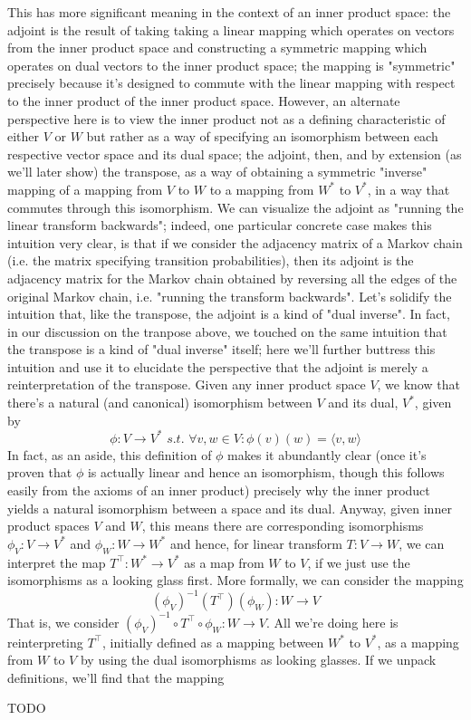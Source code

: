 \documentclass{article}
\newcommand{\nn}{\leavevmode \newline \newline}
\newcommand{\sti}{\textit{ s.t. }}
\begin{document}
This has more significant meaning in the context of an inner product space: the adjoint is the result of taking taking a linear mapping which operates on vectors from the inner product space and constructing a symmetric mapping which operates on dual vectors to the inner product space; the mapping is "symmetric" precisely because it's designed to commute with the linear mapping with respect to the inner product of the inner product space. However, an alternate perspective here is to view the inner product not as a defining characteristic of either $ V $ or $ W $ but rather as a way of specifying an isomorphism between each respective vector space and its dual space; the adjoint, then, and by extension (as we'll later show) the transpose, as a way of obtaining a symmetric "inverse" mapping of a mapping from $ V $ to $ W $ to a mapping from $ W^* $ to $ V^* $, in a way that commutes through this isomorphism. We can visualize the adjoint as "running the linear transform backwards"; indeed, one particular concrete case makes this intuition very clear, is that if we consider the adjacency matrix of a Markov chain (i.e. the matrix specifying transition probabilities), then its adjoint is the adjacency matrix for the Markov chain obtained by reversing all the edges of the original Markov chain, i.e. "running the transform backwards".
\nn
Let's solidify the intuition that, like the transpose, the adjoint is a kind of "dual inverse". In fact, in our discussion on the tranpose above, we touched on the same intuition that the transpose is a kind of "dual inverse" itself; here we'll further buttress this intuition and use it to elucidate the perspective that the adjoint is merely a reinterpretation of the transpose. Given any inner product space $ V $, we know that there's a natural (and canonical) isomorphism between $ V $ and its dual, $ V^* $, given by
    $$ \phi: V \rightarrow V^* \sti \forall v, w \in V: \phi(v)(w) = \langle v, w \rangle $$
In fact, as an aside, this definition of $ \phi $ makes it abundantly clear (once it's proven that $ \phi $ is actually linear and hence an isomorphism, though this follows easily from the axioms of an inner product) precisely why the inner product yields a natural isomorphism between a space and its dual. Anyway, given inner product spaces $ V $ and $ W $, this means there are corresponding isomorphisms $ \phi_V: V \rightarrow V^* $ and $ \phi_W: W \rightarrow W^* $ and hence, for linear transform $ T: V \rightarrow W $, we can interpret the map $ T^\intercal: W^* \rightarrow V^* $ as a map from $ W $ to $ V $, if we just use the isomorphisms as a looking glass first. More formally, we can consider the mapping
    $$ (\phi_V)^{-1}(T^\intercal)(\phi_W): W \rightarrow V $$
That is, we consider $ (\phi_V)^{-1} \circ T^\intercal \circ \phi_W: W \rightarrow V $. All we're doing here is reinterpreting $ T^\intercal $, initially defined as a mapping between $ W^* $ to $ V^* $, as a mapping from $ W $ to $ V $ by using the dual isomorphisms as looking glasses. If we unpack definitions, we'll find that the mapping 

TODO
\end{document}
